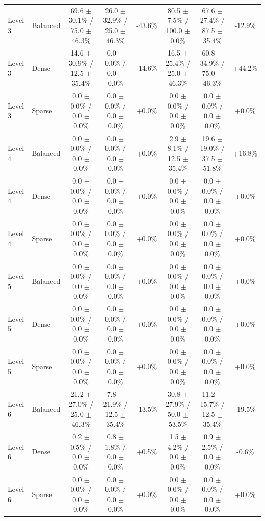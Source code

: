 \begin{table}[t]
{\begin{tabular}{llcccccc}
\midrule
Level 3 & Balanced & 69.6 $\pm$ 30.1\% / 75.0 $\pm$ 46.3\% & 26.0 $\pm$ 32.9\% / 25.0 $\pm$ 46.3\% & -43.6\% & 80.5 $\pm$ 7.5\% / 100.0 $\pm$ 0.0\% & 67.6 $\pm$ 27.4\% / 87.5 $\pm$ 35.4\% & -12.9\% \\
Level 3 & Dense & 14.6 $\pm$ 30.9\% / 12.5 $\pm$ 35.4\% & 0.0 $\pm$ 0.0\% / 0.0 $\pm$ 0.0\% & -14.6\% & 16.5 $\pm$ 25.4\% / 25.0 $\pm$ 46.3\% & 60.8 $\pm$ 34.9\% / 75.0 $\pm$ 46.3\% & +44.2\% \\
Level 3 & Sparse & 0.0 $\pm$ 0.0\% / 0.0 $\pm$ 0.0\% & 0.0 $\pm$ 0.0\% / 0.0 $\pm$ 0.0\% & +0.0\% & 0.0 $\pm$ 0.0\% / 0.0 $\pm$ 0.0\% & 0.0 $\pm$ 0.0\% / 0.0 $\pm$ 0.0\% & +0.0\% \\
\midrule
Level 4 & Balanced & 0.0 $\pm$ 0.0\% / 0.0 $\pm$ 0.0\% & 0.0 $\pm$ 0.0\% / 0.0 $\pm$ 0.0\% & +0.0\% & 2.9 $\pm$ 8.1\% / 12.5 $\pm$ 35.4\% & 19.6 $\pm$ 19.0\% / 37.5 $\pm$ 51.8\% & +16.8\% \\
Level 4 & Dense & 0.0 $\pm$ 0.0\% / 0.0 $\pm$ 0.0\% & 0.0 $\pm$ 0.0\% / 0.0 $\pm$ 0.0\% & +0.0\% & 0.0 $\pm$ 0.0\% / 0.0 $\pm$ 0.0\% & 0.0 $\pm$ 0.0\% / 0.0 $\pm$ 0.0\% & +0.0\% \\
Level 4 & Sparse & 0.0 $\pm$ 0.0\% / 0.0 $\pm$ 0.0\% & 0.0 $\pm$ 0.0\% / 0.0 $\pm$ 0.0\% & +0.0\% & 0.0 $\pm$ 0.0\% / 0.0 $\pm$ 0.0\% & 0.0 $\pm$ 0.0\% / 0.0 $\pm$ 0.0\% & +0.0\% \\
\midrule
Level 5 & Balanced & 0.0 $\pm$ 0.0\% / 0.0 $\pm$ 0.0\% & 0.0 $\pm$ 0.0\% / 0.0 $\pm$ 0.0\% & +0.0\% & 0.0 $\pm$ 0.0\% / 0.0 $\pm$ 0.0\% & 0.0 $\pm$ 0.0\% / 0.0 $\pm$ 0.0\% & +0.0\% \\
Level 5 & Dense & 0.0 $\pm$ 0.0\% / 0.0 $\pm$ 0.0\% & 0.0 $\pm$ 0.0\% / 0.0 $\pm$ 0.0\% & +0.0\% & 0.0 $\pm$ 0.0\% / 0.0 $\pm$ 0.0\% & 0.0 $\pm$ 0.0\% / 0.0 $\pm$ 0.0\% & +0.0\% \\
Level 5 & Sparse & 0.0 $\pm$ 0.0\% / 0.0 $\pm$ 0.0\% & 0.0 $\pm$ 0.0\% / 0.0 $\pm$ 0.0\% & +0.0\% & 0.0 $\pm$ 0.0\% / 0.0 $\pm$ 0.0\% & 0.0 $\pm$ 0.0\% / 0.0 $\pm$ 0.0\% & +0.0\% \\
\midrule
Level 6 & Balanced & 21.2 $\pm$ 27.0\% / 25.0 $\pm$ 46.3\% & 7.8 $\pm$ 21.9\% / 12.5 $\pm$ 35.4\% & -13.5\% & 30.8 $\pm$ 27.9\% / 50.0 $\pm$ 53.5\% & 11.2 $\pm$ 15.7\% / 12.5 $\pm$ 35.4\% & -19.5\% \\
Level 6 & Dense & 0.2 $\pm$ 0.5\% / 0.0 $\pm$ 0.0\% & 0.8 $\pm$ 1.8\% / 0.0 $\pm$ 0.0\% & +0.5\% & 1.5 $\pm$ 4.2\% / 0.0 $\pm$ 0.0\% & 0.9 $\pm$ 2.5\% / 0.0 $\pm$ 0.0\% & -0.6\% \\
Level 6 & Sparse & 0.0 $\pm$ 0.0\% / 0.0 $\pm$ 0.0\% & 0.0 $\pm$ 0.0\% / 0.0 $\pm$ 0.0\% & +0.0\% & 0.0 $\pm$ 0.0\% / 0.0 $\pm$ 0.0\% & 0.0 $\pm$ 0.0\% / 0.0 $\pm$ 0.0\% & +0.0\% \\

\end{tabular}}
\end{table}
